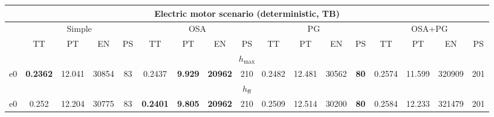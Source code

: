 \documentclass[landscape]{article}%
\begin{document}
%
\normalsize%
\begin{tabular}{||c||c|c|c|c|c|c|c|c|c|c|c|c|c|c|c|c||}%
\multicolumn{17}{c}{\textbf{Electric motor scenario (deterministic, TB)}}\\%
\hline%
&\multicolumn{4}{|c|}{\small{Simple}}&\multicolumn{4}{|c|}{\small{OSA}}&\multicolumn{4}{|c|}{\small{PG}}&\multicolumn{4}{|c|}{\small{OSA+PG}}\\%
\hline%
&\small{TT}&\small{PT}&\small{EN}&\small{PS}&\small{TT}&\small{PT}&\small{EN}&\small{PS}&\small{TT}&\small{PT}&\small{EN}&\small{PS}&\small{TT}&\small{PT}&\small{EN}&\small{PS}\\%
\hline%
\multicolumn{17}{||c||}{$h_{\max}$}\\%
\hline%
e0&\small{\textbf{0.2362}}&\small{12.041}&\small{30854}&\small{83}&\small{0.2437}&\small{\textbf{9.929}}&\small{\textbf{20962}}&\small{210}&\small{0.2482}&\small{12.481}&\small{30562}&\small{\textbf{80}}&\small{0.2574}&\small{11.599}&\small{320909}&\small{201}\\%
\hline%
\multicolumn{17}{||c||}{$h_{\mathsf{ff}}$}\\%
\hline%
e0&\small{0.252}&\small{12.204}&\small{30775}&\small{83}&\small{\textbf{0.2401}}&\small{\textbf{9.805}}&\small{\textbf{20962}}&\small{210}&\small{0.2509}&\small{12.514}&\small{30200}&\small{\textbf{80}}&\small{0.2584}&\small{12.233}&\small{321479}&\small{201}\\%
\hline%
\end{tabular}%
\end{document}
